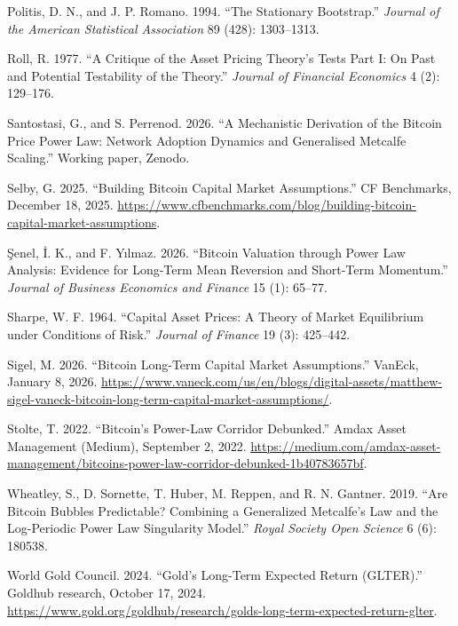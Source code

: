 \documentclass[12pt]{article}
\DeclareRobustCommand{\chg}[1]{{\color{blue}#1}}
\theoremstyle{plain}
\theoremstyle{remark}
\begin{document}
\chg{Politis, D. N., and J. P. Romano. 1994. ``The Stationary Bootstrap.'' \emph{Journal of the American Statistical Association} 89 (428): 1303--1313.}

\chg{Roll, R. 1977. ``A Critique of the Asset Pricing Theory's Tests Part I: On Past and Potential Testability of the Theory.'' \emph{Journal of Financial Economics} 4 (2): 129--176.}

\chg{Santostasi, G., and S. Perrenod. 2026. ``A Mechanistic Derivation of the Bitcoin Price Power Law: Network Adoption Dynamics and Generalised Metcalfe Scaling.'' Working paper, Zenodo.}

\chg{Selby, G. 2025. ``Building Bitcoin Capital Market Assumptions.'' CF Benchmarks, December 18, 2025. \url{https://www.cfbenchmarks.com/blog/building-bitcoin-capital-market-assumptions}.}

\chg{\c{S}enel, \.{I}. K., and F. Y{\i}lmaz. 2026. ``Bitcoin Valuation through Power Law Analysis: Evidence for Long-Term Mean Reversion and Short-Term Momentum.'' \emph{Journal of Business Economics and Finance} 15 (1): 65--77.}

Sharpe, W. F. 1964. ``Capital Asset Prices: A Theory of Market Equilibrium under Conditions of Risk.'' \emph{Journal of Finance} 19 (3): 425--442.

\chg{Sigel, M. 2026. ``Bitcoin Long-Term Capital Market Assumptions.'' VanEck, January 8, 2026. \url{https://www.vaneck.com/us/en/blogs/digital-assets/matthew-sigel-vaneck-bitcoin-long-term-capital-market-assumptions/}.}

\chg{Stolte, T. 2022. ``Bitcoin's Power-Law Corridor Debunked.'' Amdax Asset Management (Medium), September 2, 2022. \url{https://medium.com/amdax-asset-management/bitcoins-power-law-corridor-debunked-1b40783657bf}.}

\chg{Wheatley, S., D. Sornette, T. Huber, M. Reppen, and R. N. Gantner. 2019. ``Are Bitcoin Bubbles Predictable? Combining a Generalized Metcalfe's Law and the Log-Periodic Power Law Singularity Model.'' \emph{Royal Society Open Science} 6 (6): 180538.}

\chg{World Gold Council. 2024. ``Gold's Long-Term Expected Return (GLTER).'' Goldhub research, October 17, 2024. \url{https://www.gold.org/goldhub/research/golds-long-term-expected-return-glter}.}
\par\endgroup

\appendix
\renewcommand{\thesection}{\Alph{section}}
\end{document}
